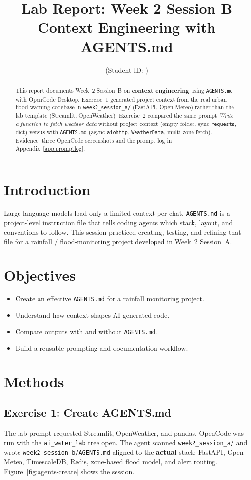 \documentclass[11pt,a4paper]{article}
\title{Lab Report: Week 2 Session B\\Context Engineering with AGENTS.md}
\author{\studentname \quad (Student ID: \studentid)}
\date{\reportdate}
\begin{document}
\maketitle

\begin{abstract}
This report documents Week~2 Session~B on \textbf{context engineering} using \texttt{AGENTS.md} with OpenCode Desktop. Exercise~1 generated project context from the real urban flood-warning codebase in \texttt{week2\_session\_a/} (FastAPI, Open-Meteo) rather than the lab template (Streamlit, OpenWeather). Exercise~2 compared the same prompt \emph{Write a function to fetch weather data} without project context (empty folder, sync \texttt{requests}, dict) versus with \texttt{AGENTS.md} (async \texttt{aiohttp}, \texttt{WeatherData}, multi-zone fetch). Evidence: three OpenCode screenshots and the prompt log in Appendix~\ref{app:promptlog}.
\end{abstract}

\section{Introduction}
Large language models load only a limited context per chat. \texttt{AGENTS.md} is a project-level instruction file that tells coding agents which stack, layout, and conventions to follow. This session practiced creating, testing, and refining that file for a rainfall / flood-monitoring project developed in Week~2 Session~A.

\section{Objectives}
\begin{itemize}[noitemsep]
  \item Create an effective \texttt{AGENTS.md} for a rainfall monitoring project.
  \item Understand how context shapes AI-generated code.
  \item Compare outputs with and without \texttt{AGENTS.md}.
  \item Build a reusable prompting and documentation workflow.
\end{itemize}

\section{Methods}

\subsection{Exercise 1: Create AGENTS.md}
The lab prompt requested Streamlit, OpenWeather, and pandas. OpenCode was run with the \texttt{ai\_water\_lab} tree open. The agent scanned \texttt{week2\_session\_a/} and wrote \texttt{week2\_session\_b/AGENTS.md} aligned to the \textbf{actual} stack: FastAPI, Open-Meteo, TimescaleDB, Redis, zone-based flood model, and alert routing. Figure~\ref{fig:agents-create} shows the session.
\end{document}
